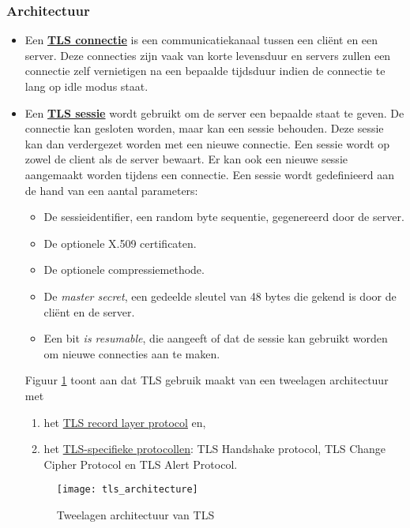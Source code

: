 \documentclass{report}
\begin{document}
	\subsubsection{Architectuur}
	\begin{itemize}
	\item Een \underline{\textbf{TLS connectie}} is een communicatiekanaal tussen een cliënt en een server. Deze connecties zijn vaak van korte levensduur en servers zullen een connectie zelf vernietigen na een bepaalde tijdsduur indien de connectie te lang op idle modus staat.

	\item Een \underline{\textbf{TLS sessie}} wordt gebruikt om de server een bepaalde staat te geven. De connectie kan gesloten worden, maar kan een sessie behouden. Deze sessie kan dan verdergezet worden met een nieuwe connectie. Een sessie wordt op zowel de client als de server bewaart. Er kan ook een nieuwe sessie aangemaakt worden tijdens een connectie. Een sessie wordt gedefinieerd aan de hand van een aantal parameters:
	\begin{itemize}
		\item De sessieidentifier, een random byte sequentie, gegenereerd door de server.
		\item De optionele X.509 certificaten.
		\item De optionele compressiemethode.
		\item De \emph{master secret}, een gedeelde sleutel van 48 bytes die gekend is door de cliënt en de server.
		\item Een bit \emph{is resumable}, die aangeeft of dat de sessie kan gebruikt worden om nieuwe connecties aan te maken.
	\end{itemize}
	Figuur \ref{fig:two-layer_architecture_TLS} toont aan dat TLS gebruik maakt van een tweelagen architectuur met 
	\begin{enumerate}
		\item het \underline{TLS record layer protocol} en, 
		\item het \underline{TLS-specifieke protocollen}: TLS Handshake protocol, TLS Change Cipher Protocol en TLS Alert Protocol.
	\end{enumerate}
	\begin{figure}[ht]
		\texttt{[image: tls\_architecture]}
		\caption{Tweelagen architectuur van TLS}
		\label{fig:two-layer_architecture_TLS}
	\end{figure}


\end{itemize}
\end{document}
